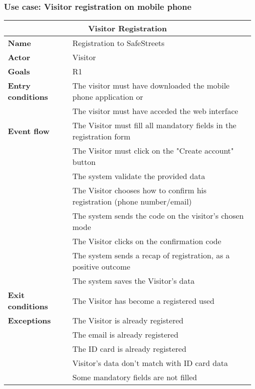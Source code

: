 \subsubsection{Use case: Visitor registration on mobile phone}
\begin{table}[h]
    \center
    \begin{tabular}{l|l}
        \multicolumn{2}{c}{\textbf{Visitor Registration}} \\
        \hline
        \textbf{Name} & Registration to SafeStreets \\
        \hline
        \textbf{Actor} & Visitor \\
        \hline
        \textbf{Goals} & R1 \\
        \hline
        \textbf{Entry conditions} & The visitor must have downloaded the mobile phone application or \\
        & The visitor must have acceded the web interface \\
        \hline
        \textbf{Event flow} & The Visitor must fill all mandatory fields in the registration form \\ 
        & The Visitor must click on the "Create account" button \\ 
        & The system validate the provided data \\
        & The Visitor chooses how to confirm his registration (phone number/email) \\
        & The system sends the code on the visitor's chosen mode \\ 
        & The Visitor clicks on the confirmation code \\ 
        & The system sends a recap of registration, as a positive outcome \\
        & The system saves the Visitor's data \\
        \hline
        \textbf{Exit conditions} & The Visitor has become a registered used \\
        \hline
        \textbf{Exceptions}
        & The Visitor is already registered \\
        & The email is already registered \\
        & The ID card is already registered \\
        & Visitor's data don't match with ID card data \\
        & Some mandatory fields are not filled \\
        \hline
    \end{tabular}
\end{table}

